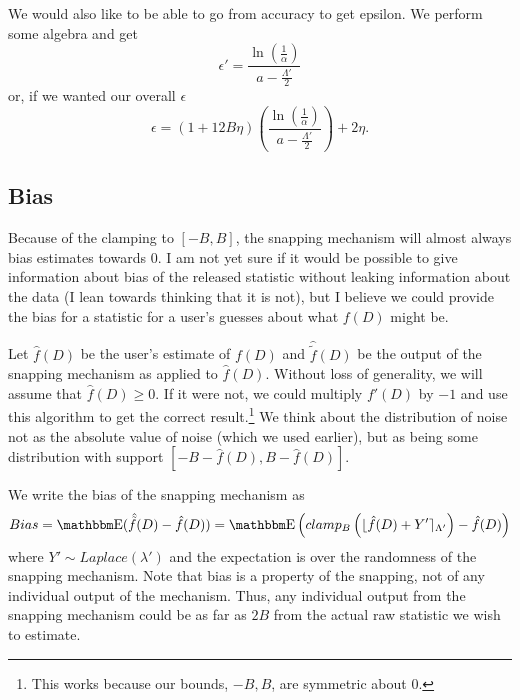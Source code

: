 \documentclass[11pt]{scrartcl} %
\begin{document}
We would also like to be able to go from accuracy to get epsilon. We perform some algebra
and get
\[ \epsilon' = \frac{\ln\left( \frac{1}{\alpha} \right)}{a - \frac{\Lambda'}{2}} \]
or, if we wanted our overall $\epsilon$
\begin{equation}
	\label{eq:accuracy_to_overall_epsilon}
	\epsilon = (1+12B\eta) \left( \frac{\ln\left( \frac{1}{\alpha} \right)}{a - \frac{\Lambda'}{2}} \right) + 2\eta.
\end{equation}

\subsection{Bias}
\label{subsec:bias}
Because of the clamping to $[-B,B]$, the snapping mechanism will almost always bias estimates towards $0$.
I am not yet sure if it would be possible to give information about bias of the released statistic without leaking information
about the data (I lean towards thinking that it is not), but I believe we could provide the bias for a statistic for
a user's guesses about what $f(D)$ might be. \newline

Let $\hat{f}(D)$ be the user's estimate of $f(D)$ and $\hat{\tilde{f}}(D)$ be the output of the snapping mechanism as applied to
$\hat{f}(D)$. Without loss of generality, we will assume that $\hat{f}(D) \geq 0$. If it were not, we could
multiply $f'(D)$ by $-1$ and use this algorithm to get the correct result.\footnote{This works because our bounds, $-B, B$, are symmetric about $0$.}
We think about the distribution of noise not as the absolute value of noise (which we used earlier), but as
being some distribution with support $[-B - \hat{f}(D), B - \hat{f}(D)]$. \newline

We write the bias of the snapping mechanism as
\[ Bias = \E(\hat{\tilde{f}}(D) - \hat{f}(D)) = \E\left( clamp_B\left( \lfloor \hat{f}(D) + Y' \rceil_{\Lambda'} \right) - \hat{f}(D) \right) \]
where $Y' \sim Laplace(\lambda')$ and the expectation is over the randomness of the snapping mechanism.
Note that bias is a property of the snapping, not of any individual output of the mechanism.
Thus, any individual output from the snapping mechanism could be as far as $2B$ from the actual raw statistic
we wish to estimate. \newline
\end{document}
